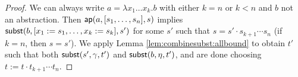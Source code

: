 \documentclass{lmcs}
\theoremstyle{theorem}\newtheorem{theorem}{Theorem}
\theoremstyle{theorem}\newtheorem{lemma}[theorem]{Lemma}
\theoremstyle{theorem}\newtheorem{corollary}[theorem]{Corollary}
\theoremstyle{definition}\newtheorem{definition}[theorem]{Definition}
\theoremstyle{definition}\newtheorem{example}[theorem]{Example}
\newcommand{\Vbound}{\mathcal{V}_{\mathit{binder}}}
\newcommand{\FV}{\mathit{FV}}
\newcommand{\domain}{\mathtt{dom}}
\newcommand{\avar}{x}
\newcommand{\bvar}{y}
\newcommand{\abs}[2]{\lambda #1.#2}
\begin{document}
\begin{proof}
We can always write $a = \abs{\avar_1 \dots \avar_k}{b}$ with either $k = n$ or $k < n$ and
$b$ not an abstraction.
Then $\mathsf{ap}(a,[s_1,\dots,s_n],s)$ implies $\subrel{b,[\avar_1:=s_1,\dots,\avar_k:=s_k],s'}$
for some $s'$ such that $s = s' \cdot s_{k+1} \cdots s_n$ (if $k = n$, then $s = s'$).
%
We apply Lemma \ref{lem:combinesubst:allbound} to obtain $t'$ such that both
$\mathsf{subst}(s',\gamma,t')$ and $\mathsf{subst}(b,\eta,t')$, and are done choosing $t := t \cdot t_{k+1}
\cdots t_n$.
\end{proof}
\end{document}
